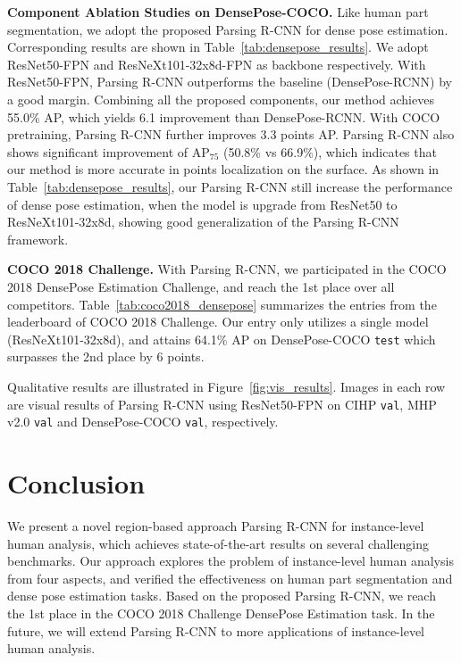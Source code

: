 \documentclass[10pt,twocolumn,letterpaper]{article}
\begin{document}
\vspace{6pt}
\noindent\textbf{Component Ablation Studies on DensePose-COCO.} Like human part segmentation, we adopt the proposed Parsing R-CNN for dense pose estimation. Corresponding results are shown in Table~\ref{tab:densepose_results}. We adopt ResNet50-FPN and ResNeXt101-32x8d-FPN as backbone respectively. With ResNet50-FPN, Parsing R-CNN outperforms the baseline (DensePose-RCNN) by a good margin. Combining all the proposed components, our method achieves 55.0\% AP, which yields 6.1 improvement than DensePose-RCNN. With COCO pretraining, Parsing R-CNN further improves 3.3 points AP. Parsing R-CNN also shows significant improvement of AP$_\text{75}$ (50.8\% vs 66.9\%), which indicates that our method is more accurate in points localization on the surface. As shown in Table~\ref{tab:densepose_results}, our Parsing R-CNN still increase the performance of dense pose estimation, when  the model is upgrade from ResNet50 to ResNeXt101-32x8d, showing good generalization of the Parsing R-CNN framework.

\vspace{6pt}
\noindent\textbf{COCO 2018 Challenge.} With Parsing R-CNN, we participated in the COCO 2018 DensePose Estimation Challenge, and reach the 1st place over all competitors. Table~\ref{tab:coco2018_densepose} summarizes the entries from the leaderboard of COCO 2018 Challenge. Our entry only utilizes a single model (ResNeXt101-32x8d), and attains 64.1\% AP on DensePose-COCO \texttt{test} which surpasses the 2nd place by 6 points.

Qualitative results are illustrated in Figure~\ref{fig:vis_results}. Images in each row are visual results of Parsing R-CNN using ResNet50-FPN on CIHP \texttt{val}, MHP v2.0 \texttt{val} and DensePose-COCO \texttt{val}, respectively. 





\section{Conclusion} We present a novel region-based approach Parsing R-CNN for instance-level human analysis, which achieves state-of-the-art results on several challenging benchmarks. Our approach explores the problem of instance-level human analysis from four aspects, and verified the effectiveness on human part segmentation and dense pose estimation tasks. Based on the proposed Parsing R-CNN, we reach the 1st place in the COCO 2018 Challenge DensePose Estimation task. In the future, we will extend Parsing R-CNN to more applications of instance-level human analysis.


{\small


}
\end{document}
